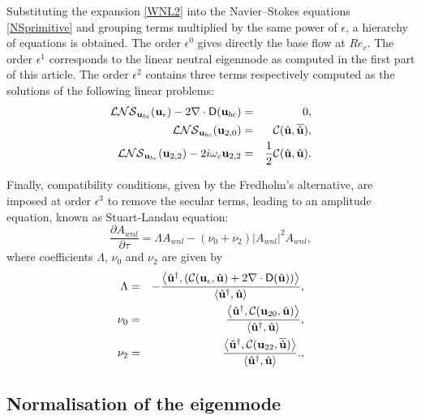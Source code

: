 \documentclass[twocolumn,10pt]{asme2ej}
\newcommand{\be}[1]{ \begin{equation} \label{#1}}
\newcommand{\ee}{\end{equation}}
\begin{document}
Substituting the expansion \ref{WNL2} into the Navier--Stokes equations \ref{NSprimitive} and grouping terms multiplied by the same power of $\epsilon$, a hierarchy of equations is obtained. The order $\epsilon^0$ gives directly the base flow at $Re_c$. The order $\epsilon^1$
corresponds to the linear neutral eigenmode as computed in the first part of this article.
The order $\epsilon^2$ contains three terms respectively computed as the solutions of the following linear problems:
\begin{eqnarray}
 {\cal LNS}_{{\bf u}_{bc}} ({\bf u}_\epsilon) - 2 \nabla \cdot {\mathsf D}({\bf u}_{bc}) &=&0,
\label{eq:LL1} \\
{\cal LNS}_{{\bf u}_{bc}} ({\bf u}_{2,0}) &=& {\cal C}(\hat{\bf u},\overline{\hat{\bf u}}), \label{eq:LL2} \\
{\cal LNS}_{{\bf u}_{bc}} ({\bf u}_{2,2}) - 2 i \omega_c {\bf u}_{2,2}  &=& \frac{1}{2} {\cal C}(\hat{\bf u},\hat{\bf u}). \label{eq:LL3}
 \end{eqnarray}

Finally, compatibility conditions, given by the Fredholm's alternative, are imposed at order $\epsilon^3$ to remove the secular terms, leading to an amplitude equation, known as Stuart-Landau equation:
\be{WNL3_2}
\frac{\partial A_{wnl}}{\partial \tau} = \Lambda A_{wnl} - (\nu_0+\nu_2)  |A_{wnl}|^2 A_{wnl},
\ee
where coefficients $\Lambda$, $\nu_0$ and $\nu_2$ are given by
\begin{eqnarray}
\Lambda &=& -\frac{ \left< {\hat{\bf u}}^\dag, 
\left( {\cal C}({\bf u}_\epsilon, \hat{\bf u}) + 2 \nabla \cdot  {\mathsf D}( \hat{\bf u}) \right) \right>}
{  \left<  \hat{\bf u}^\dag,\hat{\bf u} \right> },\label{LAMBDA}\\
\nu_0 &=& \frac{ \left< {\hat{\bf u}}^\dag,  {\cal C}({\bf u}_{20}, \hat{\bf u} ) \right>}
{  \left<  \hat{\bf u}^\dag,\hat{\bf u} \right> },\label{NU0}\\
\nu_2 &=& \frac{ \left< {\hat{\bf u}}^\dag,  {\cal C}({\bf u}_{22}, \overline{\hat{\bf u}})  \right>}
{  \left<  \hat{\bf u}^\dag,\hat{\bf u} \right> }.,\label{NU2}
 \end{eqnarray}


\subsection{Normalisation of the eigenmode}
\end{document}
